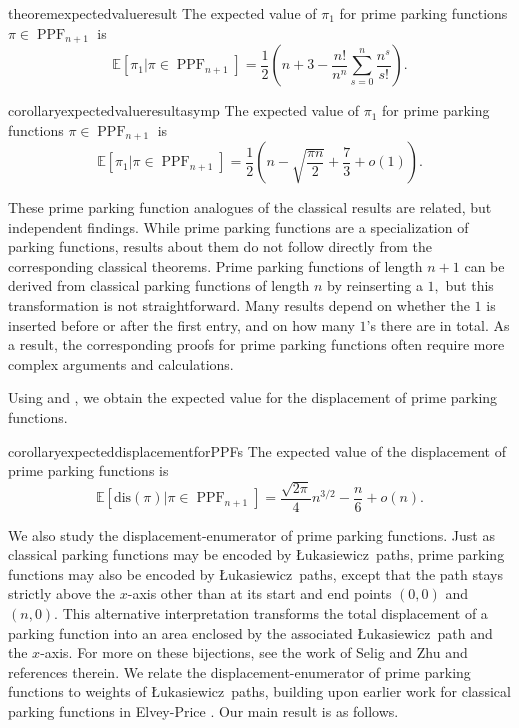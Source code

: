 \documentclass[12pt,reqno]{amsart}
\theoremstyle{definition}
\newcommand{\E}{\mathbb{E}}
\theoremstyle{remark}
\DeclareMathOperator{\PPF}{PPF}
\newcommand{\Luka}{\L ukasiewicz}
\begin{document}
\begin{restatable}[]{theorem}{expectedvalueresult}
\label{thm:expected value of pi1}
    The expected value of $\pi_1$ for prime parking functions $\pi\in \PPF_{n+1}$ is 
    \[ \E [\pi_1 | \pi \in \PPF_{n+1}]=\frac{1}{2}\left(n+3-\frac{n!}{n^n}\sum_{s=0}^n\frac{n^{s}}{s!}\right).\]
\end{restatable}

\begin{restatable}{corollary}{expectedvalueresultasymp}
\label{cr:expected value of pi1}
 The expected value of $\pi_1$ for prime parking functions $\pi\in \PPF_{n+1}$ is 
    \[ \E [\pi_1 | \pi \in \PPF_{n+1}]=\frac12 \left (n-\sqrt{\frac{\pi n}{2}} + \frac73 + o(1) \right ).\]
\end{restatable}
These prime parking function analogues of the classical results are related, but independent findings.  While prime parking functions are a specialization of parking functions, results about them do not follow directly from the corresponding classical theorems.  Prime parking functions of length $n+1$ can be derived from classical parking functions of length $n$ by reinserting a $1,$ but this transformation is not straightforward.  Many results depend on whether the $1$ is inserted before or after the first entry, and on how many $1$'s there are in total.  As a result, the corresponding proofs for prime parking functions often require more complex arguments and calculations.

Using  and , we obtain the expected value for the displacement of prime parking functions.

\begin{restatable}{corollary}{expecteddisplacementforPPFs}
\label{expecteddisplacementforPPFs}
The expected value of the displacement of prime parking functions is
\[\E [\text{dis}(\pi)|\pi\in\PPF_{n+1}]=\frac{\sqrt{2\pi}}{4}n^{3/2}-\frac{n}{6}+o(n).\]    
\end{restatable}



We also study the displacement-enumerator of prime parking functions. Just as classical parking functions may be encoded by \Luka~paths, prime parking functions may also be encoded by \Luka~paths, except that the path stays strictly above the $x$-axis other than at its start and end points $(0, 0)$ and $(n, 0)$. 
This alternative interpretation transforms the total displacement of a parking function into an area enclosed by the associated \Luka~path and the $x$-axis. For more on these bijections, see the work of Selig and Zhu \cite{SZ} and references therein. 
We relate the displacement-enumerator of prime parking functions to weights of \Luka~paths, building upon earlier work for classical parking functions in Elvey-Price \cite{Elvey}. Our main result is as follows.
\end{document}
